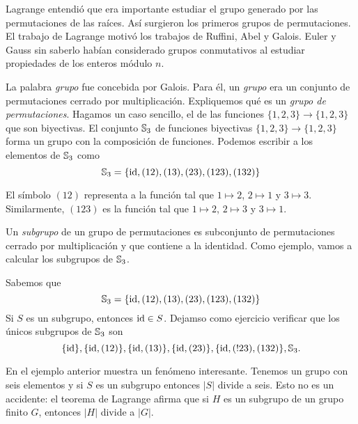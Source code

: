 Lagrange entendió que era importante estudiar el grupo generado por las
permutaciones de las raíces. Así surgieron los primeros 
grupos de permutaciones. 
El trabajo de Lagrange motivó los trabajos de Ruffini, Abel y Galois. 
Euler y Gauss sin saberlo habían considerado grupos conmutativos 
al estudiar propiedades de los enteros módulo $n$. 

La palabra
\emph{grupo} fue concebida por Galois. Para él, un \emph{grupo} era un
conjunto de permutaciones cerrado por multiplicación. 
Expliquemos qué es un \emph{grupo de permutaciones}. Hagamos un caso sencillo, el de las funciones 
$\{1,2,3\}\to\{1,2,3\}$ que son biyectivas. El conjunto $\mathbb{S}_3$ de funciones
biyectivas $\{1,2,3\}\to\{1,2,3\}$ forma un grupo con la composición de funciones. Podemos escribir
a los elementos de $\mathbb{S}_3$ como
\[
	\mathbb{S}_3=\{\operatorname{id},(12),(13),(23),(123),(132)\}
\]

El símbolo $(12)$ representa a la función tal que $1\mapsto 2$, $2\mapsto 1$ y $3\mapsto 3$. Similarmente, $(123)$ es la función tal que $1\mapsto 2$, $2\mapsto 3$ y $3\mapsto 1$. 



Un \emph{subgrupo} de un grupo de permutaciones es subconjunto de permutaciones 
cerrado por multiplicación y 
que contiene a la identidad. Como ejemplo, vamos a calcular los subgrupos de $\mathbb{S}_3$.

\begin{example}
\label{exa:S3}
    Sabemos que 
    \[
	\mathbb{S}_3=\{\operatorname{id},(12),(13),(23),(123),(132)\}
    \]
    Si $S$ es un subgrupo, entonces $\operatorname{id}\in S$. Dejamso como ejercicio
    verificar que los únicos subgrupos de $\mathbb{S}_3$ son
    \[
    \{\operatorname{id}\},\{\operatorname{id},(12)\},\{\operatorname{id},(13)\},\{\operatorname{id},(23)\},\{\operatorname{id},(!23),(132)\},\mathbb{S}_3.
    \]
\end{example}

En el ejemplo anterior muestra un fenómeno interesante. Tenemos un grupo con seis
elementos y si $S$ es un subgrupo entonces $|S|$ divide a seis. Esto no es un accidente:  
el teorema de Lagrange afirma que si $H$ es un subgrupo de un grupo finito $G$,
entonces $|H|$ divide a $|G|$. 


